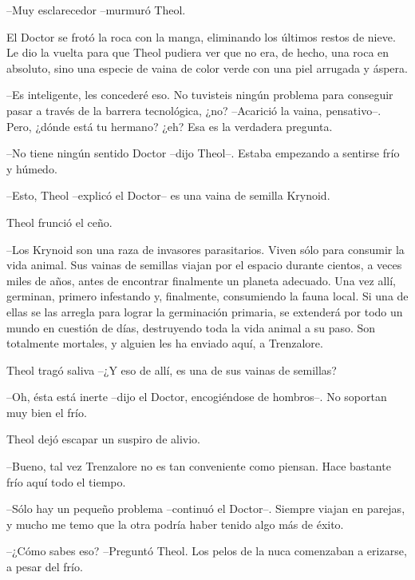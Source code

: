 --Muy esclarecedor --murmuró Theol.



El Doctor se frotó la roca con la manga, eliminando los últimos restos de nieve. Le dio la vuelta para que Theol pudiera ver que no era, de hecho, una roca en absoluto, sino una especie de vaina de color verde con una piel arrugada y áspera.

--Es inteligente, les concederé eso. No tuvisteis ningún problema para conseguir pasar a través de la barrera tecnológica, ¿no? --Acarició la vaina, pensativo--. Pero, ¿dónde está tu hermano? ¿eh? Esa es la verdadera pregunta.


--No tiene ningún sentido Doctor --dijo Theol--. Estaba empezando a sentirse frío y húmedo.



--Esto, Theol --explicó el Doctor-- es una vaina de semilla Krynoid.



Theol frunció el ceño.



--Los Krynoid son una raza de invasores parasitarios. Viven sólo para consumir la vida animal. Sus vainas de semillas viajan por el espacio durante cientos, a veces miles de años, antes de encontrar finalmente un planeta adecuado. Una vez allí, germinan, primero infestando y, finalmente, consumiendo la fauna local. Si una de ellas se las arregla para lograr la germinación primaria, se extenderá por todo un mundo en cuestión de días, destruyendo toda la vida animal a su paso. Son totalmente mortales, y alguien les ha enviado aquí, a Trenzalore.



Theol tragó saliva --¿Y eso de allí, es una de sus vainas de semillas?



--Oh, ésta está inerte --dijo el Doctor, encogiéndose de hombros--. No soportan muy bien el frío.



Theol dejó escapar un suspiro de alivio.

--Bueno, tal vez Trenzalore no es tan conveniente como piensan. Hace bastante frío aquí todo el tiempo.



--Sólo hay un pequeño problema --continuó el Doctor--. Siempre viajan en parejas, y mucho me temo que la otra podría haber tenido algo más de éxito.



--¿Cómo sabes eso? --Preguntó Theol. Los pelos de la nuca comenzaban a erizarse, a pesar del frío.




